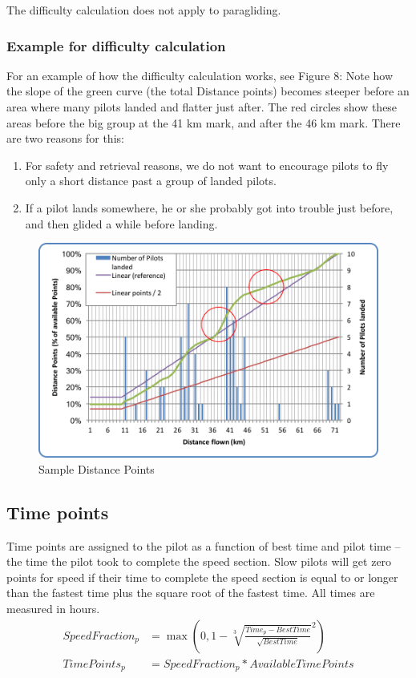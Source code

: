 \documentclass{article}
\begin{document}
\begin{pg}
The difficulty calculation does not apply to paragliding.
\end{pg}

\subsubsection{Example for difficulty calculation}
For an example of how the difficulty calculation works, see Figure 8: Note how
the slope of the green curve (the total Distance points) becomes steeper before
an area where many pilots landed and flatter just after. The red circles show
these areas before the big group at the 41 km mark, and after the 46 km mark.
There are two reasons for this:
\begin{enumerate}
    \item For safety and retrieval reasons, we do not want to encourage pilots to fly only a short distance past a group of landed pilots.
    \item If a pilot lands somewhere, he or she probably got into trouble just before, and then glided a while before landing.
\end{enumerate}

\begin{figure}[h]
    \centering
    \includegraphics[scale=0.8]{img/distance-points.png}
    \caption{Sample Distance Points}
\end{figure}

\subsection{Time points}
Time points are assigned to the pilot as a function of best time and pilot time
– the time the pilot took to complete the speed section. Slow pilots will get
zero points for speed if their time to complete the speed section is equal to
or longer than the fastest time plus the square root of the fastest time. All
times are measured in hours.
\begin{align*}
    SpeedFraction_p &= \max(0, 1 - \sqrt[3]{\frac{Time_p - BestTime}{\sqrt{BestTime}}}^2) \\
    TimePoints_p &= SpeedFraction_p * AvailableTimePoints
\end{align*}
\end{document}
